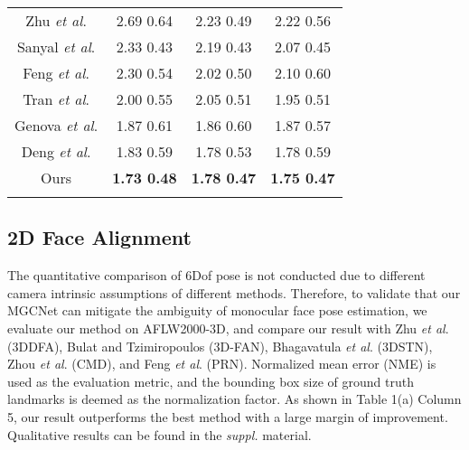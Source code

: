 \documentclass[runningheads]{llncs}
\newcommand{\etal}{\textit{et al}.}
\begin{document}
\begin{table}
{{\begin{tabular}{|c|c|c|c|}
				\hlineB{3}
				Zhu \etal \cite{dataset_aflw20003D_300WLP_zhu2016face}  & 2.69  0.64     & 2.23  0.49   & 2.22  0.56
				\\
				Sanyal \etal \cite{unsuper_mul_sanyal2019learning_ring}  & 2.33  0.43     & 2.19  0.43   & 2.07  0.45
				\\
				Feng \etal \cite{super_fit_volu_exp_feng2018joint}  & 2.30  0.54     & 2.02  0.50   & 2.10  0.60
				\\ 
				Tran \etal \cite{super_fit_endtoend_iter_tuan2017regressing}  & 2.00  0.55     & 2.05  0.51   & 1.95  0.51
				\\ 
				Genova \etal \cite{unsuper_genova2018unsupervised}            & 1.87  0.61     & 1.86  0.60   & 1.87  0.57 
				\\ 
				Deng \etal \cite{unsuper_mul_ng2019accurate}                  & 1.83  0.59     & 1.78  0.53   & 1.78  0.59 
				\\ 
				Ours                                                          & \textbf{1.73  0.48}     & \textbf{1.78  0.47}   & \textbf{1.75  0.47 }
				\\ 
				\hlineB{3}
			\end{tabular}
		}
		\label{tab:micc_video}
		
	}
\end{table}


\subsection{2D Face Alignment}
The quantitative comparison of 6Dof pose is not conducted due to different camera intrinsic assumptions of different methods. Therefore, to validate that our MGCNet can mitigate the ambiguity of monocular face pose estimation, we evaluate our method on AFLW2000-3D, and compare our result with Zhu \etal \cite{dataset_aflw20003D_300WLP_zhu2016face} (3DDFA), Bulat and Tzimiropoulos  \cite{dataset_bulat2017far_lsw3d} (3D-FAN), Bhagavatula \etal \cite{super_fit_stn_bhagavatula2017faster} (3DSTN), Zhou \etal \cite{unsuper_zhou2019dense} (CMD), and Feng \etal \cite{super_fit_volu_exp_feng2018joint} (PRN). 
Normalized mean error (NME) is used as the evaluation metric, and the bounding box size of ground truth landmarks is deemed as the normalization factor. 
As shown in Table 1(a) Column 5, our result outperforms the best method with a large margin of  improvement.
Qualitative results can be found in the \textit{suppl.} material.
\end{document}
